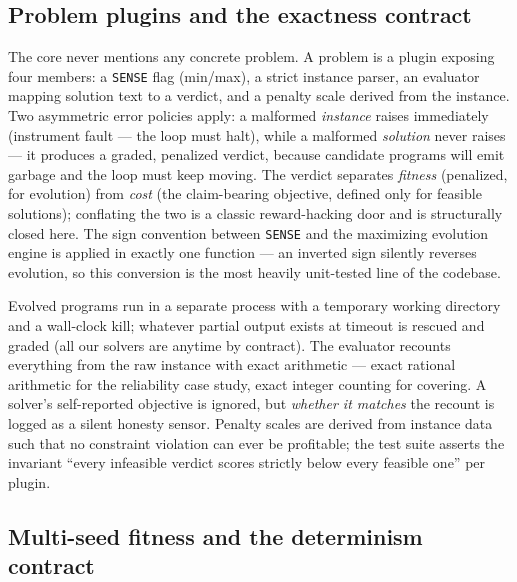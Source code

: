 \subsection{Problem plugins and the exactness contract}

The core never mentions any concrete problem. A problem is a plugin
exposing four members: a \texttt{SENSE} flag (min/max), a strict
instance parser, an evaluator mapping solution text to a verdict, and
a penalty scale derived from the instance. Two asymmetric error
policies apply: a malformed \emph{instance} raises immediately
(instrument fault --- the loop must halt), while a malformed
\emph{solution} never raises --- it produces a graded, penalized
verdict, because candidate programs will emit garbage and the loop
must keep moving. The verdict separates \emph{fitness} (penalized,
for evolution) from \emph{cost} (the claim-bearing objective, defined
only for feasible solutions); conflating the two is a classic
reward-hacking door and is structurally closed here. The sign
convention between \texttt{SENSE} and the maximizing evolution engine
is applied in exactly one function --- an inverted sign silently
reverses evolution, so this conversion is the most heavily
unit-tested line of the codebase.

Evolved programs run in a separate process with a temporary working
directory and a wall-clock kill; whatever partial output exists at
timeout is rescued and graded (all our solvers are anytime by
contract). The evaluator recounts everything from the raw instance
with exact arithmetic --- exact rational arithmetic for the
reliability case study, exact integer counting for covering. A
solver's self-reported objective is ignored, but \emph{whether it
matches} the recount is logged as a silent honesty sensor. Penalty
scales are derived from instance data such that no constraint
violation can ever be profitable; the test suite asserts the
invariant ``every infeasible verdict scores strictly below every
feasible one'' per plugin.

\subsection{Multi-seed fitness and the determinism contract}

